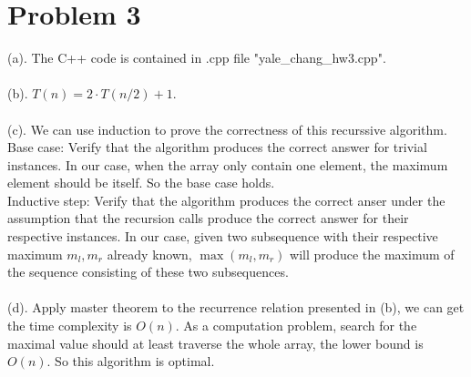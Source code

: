 \documentclass[11pt]{article}
\begin{document}
\section{Problem 3}
(a). The C++ code is contained in .cpp file "yale\_chang\_hw3.cpp".\\
\\
(b). $T(n) = 2\cdot T(n/2)+1$.\\
\\
(c). We can use induction to prove the correctness of this recurssive algorithm.\\
Base case: Verify that the algorithm produces the correct answer for trivial instances. In our case, when the array only contain one element, the maximum element should be itself. So the base case holds.\\
Inductive step: Verify that the algorithm produces the correct anser under the assumption that the recursion calls produce the correct answer for their respective instances. In our case, given two subsequence with their respective maximum $m_l,m_r$ already known, $\max(m_l,m_r)$ will produce the maximum of the sequence consisting of these two subsequences.\\
\\
(d). Apply master theorem to the recurrence relation presented in (b), we can get the time complexity is $O(n)$. As a computation problem, search for the maximal value should at least traverse the whole array, the lower bound is $O(n)$. So this algorithm is optimal.
\end{document}
